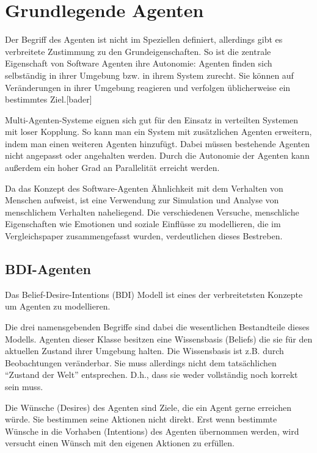

\chapter{Grundlegende Agenten}
Der Begriff des Agenten ist nicht im Speziellen definiert, allerdings gibt es verbreitete Zustimmung zu den Grundeigenschaften.
So ist die zentrale Eigenschaft von Software Agenten ihre Autonomie: Agenten finden sich selbständig in ihrer Umgebung bzw. in ihrem System zurecht.
Sie können auf Veränderungen in ihrer Umgebung reagieren und verfolgen üblicherweise ein bestimmtes Ziel.[bader]%

Multi-Agenten-Systeme eignen sich gut für den Einsatz in verteilten Systemen mit loser Kopplung.
So kann man ein System mit zusätzlichen Agenten erweitern, indem man einen weiteren Agenten hinzufügt.
Dabei müssen bestehende Agenten nicht angepasst oder angehalten werden.
Durch die Autonomie der Agenten kann außerdem ein hoher Grad an Parallelität erreicht werden.

Da das Konzept des Software-Agenten Ähnlichkeit mit dem Verhalten von Menschen aufweist, ist eine Verwendung zur Simulation und Analyse von menschlichem Verhalten naheliegend.
Die verschiedenen Versuche, menschliche Eigenschaften wie Emotionen und soziale Einflüsse zu modellieren, die im Vergleichspaper zusammengefasst wurden, verdeutlichen dieses Bestreben.

\section{BDI-Agenten}
Das Belief-Desire-Intentions (BDI) Modell ist eines der verbreitetsten Konzepte um Agenten zu modellieren.

Die drei namensgebenden Begriffe sind dabei die wesentlichen Bestandteile dieses Modells.
Agenten dieser Klasse besitzen eine Wissensbasis (Beliefs) die sie für den aktuellen Zustand ihrer Umgebung halten.
Die Wissensbasis ist z.B. durch Beobachtungen veränderbar.
Sie muss allerdings nicht dem tatsächlichen \enquote{Zustand der Welt} entsprechen.
D.h., dass sie weder vollständig noch korrekt sein muss.

Die Wünsche (Desires) des Agenten sind Ziele, die ein Agent gerne erreichen würde.
Sie bestimmen seine Aktionen nicht direkt. 
Erst wenn bestimmte Wünsche in die Vorhaben (Intentions) des Agenten übernommen werden, wird versucht einen Wünsch mit den eigenen Aktionen zu erfüllen.

